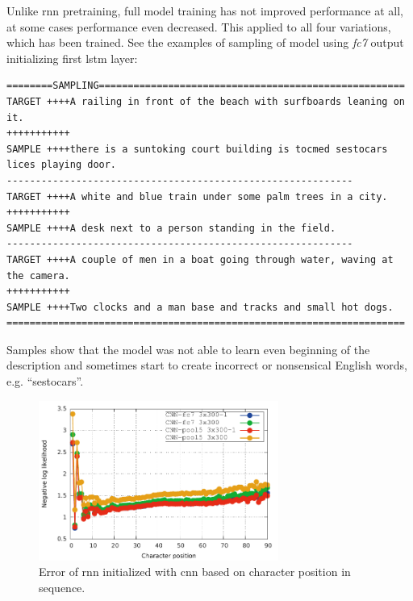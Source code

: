 Unlike \gls{rnn} pretraining, full model training has not improved performance at all, at some cases performance even decreased. This applied to all four variations, which has been trained. See the examples of sampling of model using \emph{fc7} output initializing first \gls{lstm} layer:

\vspace{5mm}
\begin{lstlisting}[breakindent=58pt]
========SAMPLING=====================================================
TARGET ++++A railing in front of the beach with surfboards leaning on it.
+++++++++++
SAMPLE ++++there is a suntoking court building is tocmed sestocars lices playing door.
------------------------------------------------------------
TARGET ++++A white and blue train under some palm trees in a city.
+++++++++++
SAMPLE ++++A desk next to a person standing in the field.
------------------------------------------------------------
TARGET ++++A couple of men in a boat going through water, waving at the camera.
+++++++++++
SAMPLE ++++Two clocks and a man base and tracks and small hot dogs.
=====================================================================
\end{lstlisting}
\vspace{5mm}

Samples show that the model was not able to learn even beginning of the description and sometimes start to create incorrect or nonsensical English  words, e.g. \textquotedblleft sestocars\textquotedblright.

\begin{figure}[!t]
	\centering
	\includegraphics[width=0.7\textwidth]{fig/error_cnn.pdf}
	\caption{Error of \gls{rnn} initialized with \gls{cnn} based on character position in sequence.
		\label{fig:error_cnn}}
\end{figure}

